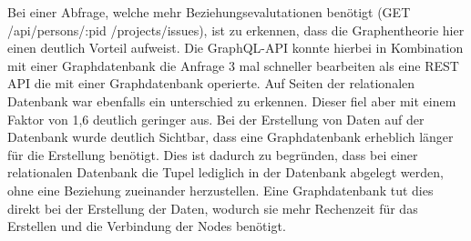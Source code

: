 \newline
\noindent
Bei einer Abfrage, welche mehr Beziehungsevalutationen benötigt  (GET /api/persons/:pid /projects/issues), ist zu erkennen, dass die Graphentheorie hier einen deutlich Vorteil aufweist. Die GraphQL-API konnte hierbei in Kombination mit einer Graphdatenbank die Anfrage 3 mal schneller bearbeiten als eine REST API die mit einer Graphdatenbank operierte. Auf Seiten der relationalen Datenbank war ebenfalls ein unterschied zu erkennen. Dieser fiel aber mit einem Faktor von 1,6 deutlich geringer aus.
\newline
\noindent
Bei der Erstellung von Daten auf der Datenbank wurde deutlich Sichtbar, dass eine Graphdatenbank erheblich länger für die Erstellung benötigt. Dies ist dadurch zu begründen, dass bei einer relationalen Datenbank die Tupel lediglich in der Datenbank abgelegt werden, ohne eine Beziehung zueinander herzustellen. Eine Graphdatenbank tut dies direkt bei der Erstellung der Daten, wodurch sie mehr Rechenzeit für das Erstellen und die Verbindung der Nodes benötigt. \citep{constantinov2015running}

